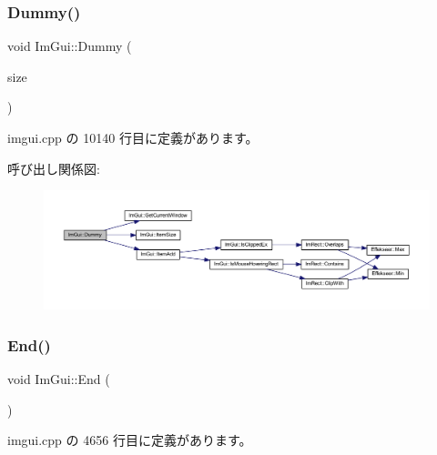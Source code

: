 \subsubsection{\texorpdfstring{Dummy()}{Dummy()}}
{\footnotesize\ttfamily void Im\+Gui\+::\+Dummy (\begin{DoxyParamCaption}\item[{const \mbox{\hyperlink{struct_im_vec2}{Im\+Vec2}} \&}]{size }\end{DoxyParamCaption})}



 imgui.\+cpp の 10140 行目に定義があります。

呼び出し関係図\+:\nopagebreak
\begin{figure}[H]
\begin{center}
\leavevmode
\includegraphics[width=350pt]{namespace_im_gui_a8b0fb07113251301ff897b8578a53f34_cgraph}
\end{center}
\end{figure}
\mbox{\label{namespace_im_gui_a5479d93794a004c67ceb6d13f37c8254}} 
\subsubsection{\texorpdfstring{End()}{End()}}
{\footnotesize\ttfamily void Im\+Gui\+::\+End (\begin{DoxyParamCaption}{ }\end{DoxyParamCaption})}



 imgui.\+cpp の 4656 行目に定義があります。

